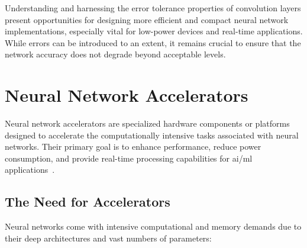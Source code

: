 Understanding and harnessing the error tolerance properties of convolution layers present opportunities for designing more efficient and compact neural network implementations, especially vital for low-power devices and real-time applications. While errors can be introduced to an extent, it remains crucial to ensure that the network accuracy does not degrade beyond acceptable levels.


\section{Neural Network Accelerators}
Neural network accelerators are specialized hardware components or platforms designed to accelerate the computationally intensive tasks associated with neural networks. Their primary goal is to enhance performance, reduce power consumption, and provide real-time processing capabilities for \gls{ai}/\gls{ml} applications~\cite{sze2017efficient}.

\subsection{The Need for Accelerators}
Neural networks come with intensive computational and memory demands due to their deep architectures and vast numbers of parameters:


